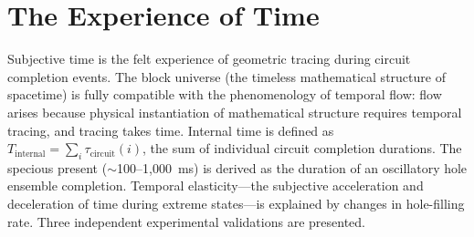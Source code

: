 \chapter{The Experience of Time}
\label{ch:time}


\begin{chapterabstract}
Subjective time is the felt experience of geometric tracing during circuit completion events. The block universe (the timeless mathematical structure of spacetime) is fully compatible with the phenomenology of temporal flow: flow arises because physical instantiation of mathematical structure requires temporal tracing, and tracing takes time. Internal time is defined as $T_{\mathrm{internal}} = \sum_i \tau_{\mathrm{circuit}}(i)$, the sum of individual circuit completion durations. The specious present ($\sim$100--1,000~ms) is derived as the duration of an oscillatory hole ensemble completion. Temporal elasticity---the subjective acceleration and deceleration of time during extreme states---is explained by changes in hole-filling rate. Three independent experimental validations are presented.
\end{chapterabstract}


